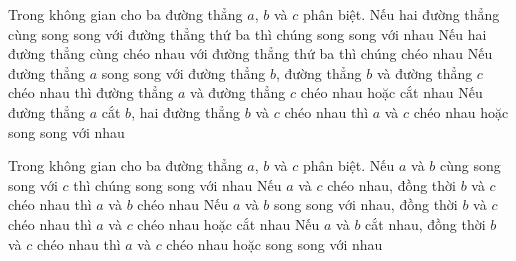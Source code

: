\begin{ex}%
	 Trong không gian cho ba đường thẳng $a$, $ b$ và $c$ phân biệt.
	\choiceTF 
		{\True Nếu hai đường thẳng cùng song song với đường thẳng thứ ba thì chúng  song song với nhau}
		{Nếu hai đường thẳng cùng chéo nhau với đường thẳng  thứ ba thì chúng chéo nhau}
		{\True Nếu đường thẳng $a$ song song với đường thẳng $b$,  đường thẳng $b$ và đường thẳng $c$ chéo nhau thì đường thẳng $a$ và đường thẳng $c$ chéo nhau hoặc cắt nhau}
		{Nếu đường thẳng $a$ cắt $b$, hai đường thẳng $b$ và $c$ chéo  nhau thì $a$ và $c$ chéo nhau hoặc song song với nhau}
\end{ex}

\begin{ex}%
	Trong không gian cho ba đường thẳng $a$, $b$ và $c$  phân biệt.
	\choiceTF 
		{\True Nếu $a$ và $b$ cùng song song với $c$ thì chúng  song song với nhau}
		{Nếu $a$ và $c$ chéo nhau, đồng thời $b$ và $c$ chéo nhau thì $a$ và $b$ chéo nhau} 
		{\True Nếu $a$ và $b$ song song với nhau, đồng thời $b$ và $c$ chéo nhau thì $a$ và $c$ chéo nhau  hoặc cắt nhau}
		{Nếu $a$ và $b$ cắt nhau, đồng thời $b$ và $c$ chéo nhau thì $a$ và  $c$ chéo nhau hoặc song song với nhau}
\end{ex}

